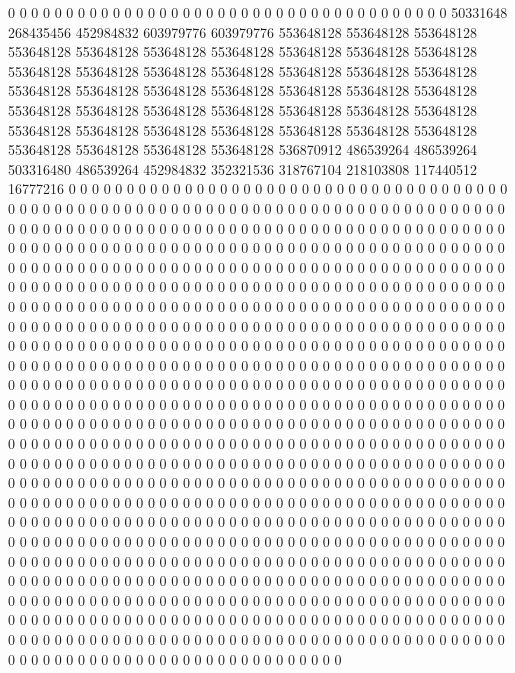 0 0 0 0 0 0 0 0 0 0 0 0 0 0 0 0 0 0 0 0 0 0 0 0 0 0 0 0 0 0 0 0 0 0 0 0 0 0 50331648 268435456 452984832 603979776 603979776 553648128 553648128 553648128 553648128 553648128 553648128 553648128 553648128 553648128 553648128 553648128 553648128 553648128 553648128 553648128 553648128 553648128 553648128 553648128 553648128 553648128 553648128 553648128 553648128 553648128 553648128 553648128 553648128 553648128 553648128 553648128 553648128 553648128 553648128 553648128 553648128 553648128 553648128 553648128 553648128 553648128 553648128 536870912 486539264 486539264 503316480 486539264 452984832 352321536 318767104 218103808 117440512 16777216 0 0 0 0 0 0 0 0 0 0 0 0 0 0 0 0 0 0 0 0 0 0 0 0 0 0 0 0 0 0 0 0
0 0 0 0 0 0 0 0 0 0 0 0 0 0 0 0 0 0 0 0 0 0 0 0 0 0 0 0 0 0 0 0 0 0 0 0 0 0 0 0 0 0 0 0 0 0 0 0 0 0 0 0 0 0 0 0 0 0 0 0 0 0 0 0 0 0 0 0 0 0 0 0 0 0 0 0 0 0 0 0 0 0 0 0 0 0 0 0 0 0 0 0 0 0 0 0 0 0 0 0 0 0 0 0 0 0 0 0 0 0 0 0 0 0 0 0 0 0 0 0 0 0 0 0 0 0 0 0
0 0 0 0 0 0 0 0 0 0 0 0 0 0 0 0 0 0 0 0 0 0 0 0 0 0 0 0 0 0 0 0 0 0 0 0 0 0 0 0 0 0 0 0 0 0 0 0 0 0 0 0 0 0 0 0 0 0 0 0 0 0 0 0 0 0 0 0 0 0 0 0 0 0 0 0 0 0 0 0 0 0 0 0 0 0 0 0 0 0 0 0 0 0 0 0 0 0 0 0 0 0 0 0 0 0 0 0 0 0 0 0 0 0 0 0 0 0 0 0 0 0 0 0 0 0 0 0
0 0 0 0 0 0 0 0 0 0 0 0 0 0 0 0 0 0 0 0 0 0 0 0 0 0 0 0 0 0 0 0 0 0 0 0 0 0 0 0 0 0 0 0 0 0 0 0 0 0 0 0 0 0 0 0 0 0 0 0 0 0 0 0 0 0 0 0 0 0 0 0 0 0 0 0 0 0 0 0 0 0 0 0 0 0 0 0 0 0 0 0 0 0 0 0 0 0 0 0 0 0 0 0 0 0 0 0 0 0 0 0 0 0 0 0 0 0 0 0 0 0 0 0 0 0 0 0
0 0 0 0 0 0 0 0 0 0 0 0 0 0 0 0 0 0 0 0 0 0 0 0 0 0 0 0 0 0 0 0 0 0 0 0 0 0 0 0 0 0 0 0 0 0 0 0 0 0 0 0 0 0 0 0 0 0 0 0 0 0 0 0 0 0 0 0 0 0 0 0 0 0 0 0 0 0 0 0 0 0 0 0 0 0 0 0 0 0 0 0 0 0 0 0 0 0 0 0 0 0 0 0 0 0 0 0 0 0 0 0 0 0 0 0 0 0 0 0 0 0 0 0 0 0 0 0
0 0 0 0 0 0 0 0 0 0 0 0 0 0 0 0 0 0 0 0 0 0 0 0 0 0 0 0 0 0 0 0 0 0 0 0 0 0 0 0 0 0 0 0 0 0 0 0 0 0 0 0 0 0 0 0 0 0 0 0 0 0 0 0 0 0 0 0 0 0 0 0 0 0 0 0 0 0 0 0 0 0 0 0 0 0 0 0 0 0 0 0 0 0 0 0 0 0 0 0 0 0 0 0 0 0 0 0 0 0 0 0 0 0 0 0 0 0 0 0 0 0 0 0 0 0 0 0
0 0 0 0 0 0 0 0 0 0 0 0 0 0 0 0 0 0 0 0 0 0 0 0 0 0 0 0 0 0 0 0 0 0 0 0 0 0 0 0 0 0 0 0 0 0 0 0 0 0 0 0 0 0 0 0 0 0 0 0 0 0 0 0 0 0 0 0 0 0 0 0 0 0 0 0 0 0 0 0 0 0 0 0 0 0 0 0 0 0 0 0 0 0 0 0 0 0 0 0 0 0 0 0 0 0 0 0 0 0 0 0 0 0 0 0 0 0 0 0 0 0 0 0 0 0 0 0
0 0 0 0 0 0 0 0 0 0 0 0 0 0 0 0 0 0 0 0 0 0 0 0 0 0 0 0 0 0 0 0 0 0 0 0 0 0 0 0 0 0 0 0 0 0 0 0 0 0 0 0 0 0 0 0 0 0 0 0 0 0 0 0 0 0 0 0 0 0 0 0 0 0 0 0 0 0 0 0 0 0 0 0 0 0 0 0 0 0 0 0 0 0 0 0 0 0 0 0 0 0 0 0 0 0 0 0 0 0 0 0 0 0 0 0 0 0 0 0 0 0 0 0 0 0 0 0
0 0 0 0 0 0 0 0 0 0 0 0 0 0 0 0 0 0 0 0 0 0 0 0 0 0 0 0 0 0 0 0 0 0 0 0 0 0 0 0 0 0 0 0 0 0 0 0 0 0 0 0 0 0 0 0 0 0 0 0 0 0 0 0 0 0 0 0 0 0 0 0 0 0 0 0 0 0 0 0 0 0 0 0 0 0 0 0 0 0 0 0 0 0 0 0 0 0 0 0 0 0 0 0 0 0 0 0 0 0 0 0 0 0 0 0 0 0 0 0 0 0 0 0 0 0 0 0

